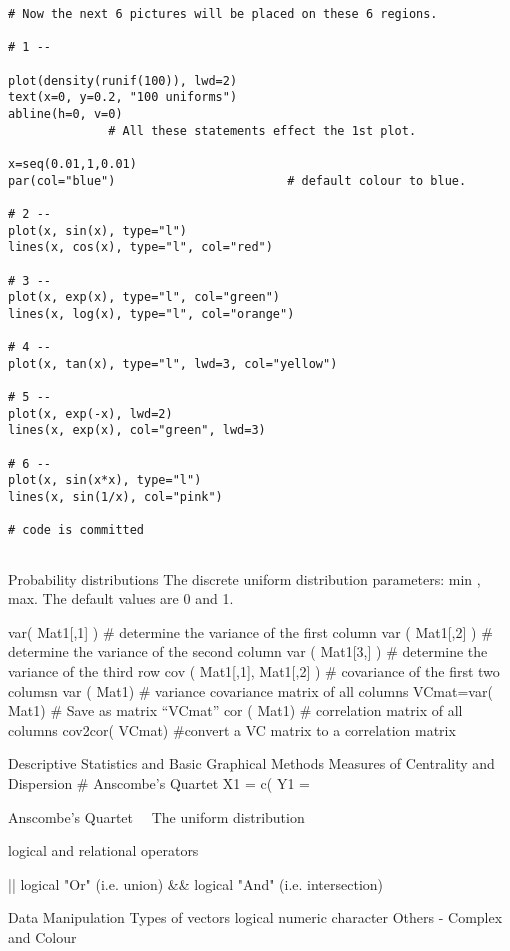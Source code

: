 \begin{verbatim}
# Now the next 6 pictures will be placed on these 6 regions. 

# 1 --

plot(density(runif(100)), lwd=2)
text(x=0, y=0.2, "100 uniforms")        
abline(h=0, v=0)
	          # All these statements effect the 1st plot.

x=seq(0.01,1,0.01)
par(col="blue")                        # default colour to blue.

# 2 --
plot(x, sin(x), type="l")
lines(x, cos(x), type="l", col="red")

# 3 --
plot(x, exp(x), type="l", col="green")
lines(x, log(x), type="l", col="orange")

# 4 --
plot(x, tan(x), type="l", lwd=3, col="yellow")

# 5 --
plot(x, exp(-x), lwd=2)
lines(x, exp(x), col="green", lwd=3)

# 6 --
plot(x, sin(x*x), type="l")
lines(x, sin(1/x), col="pink")

# code is committed
 
\end{verbatim}

 
Probability distributions
The discrete uniform distribution
parameters: min , max.
The default values are 0 and 1.
 



var( Mat1[,1] )			# determine the variance of the first column 
var ( Mat1[,2] )			# determine the variance of the second column
var ( Mat1[3,] )			# determine the variance of the third row
cov ( Mat1[,1], Mat1[,2] )	# covariance of the first two columsn
var ( Mat1)			# variance covariance matrix of all columns
VCmat=var( Mat1)		# Save as matrix “VCmat”
cor ( Mat1)			# correlation matrix of all columns
cov2cor( VCmat)		#convert a VC matrix to a correlation matrix

 
Descriptive Statistics and Basic Graphical Methods
Measures of Centrality and Dispersion
# Anscombe’s  Quartet
X1 = c(
Y1 =
 

Anscombe’s Quartet 
The uniform distribution





logical and relational operators
 
||      logical "Or"      (i.e.  union)
&&     logical "And"   (i.e. intersection)   

 



Data Manipulation
Types of vectors
	logical
	numeric
	character
    Others  - Complex and Colour

